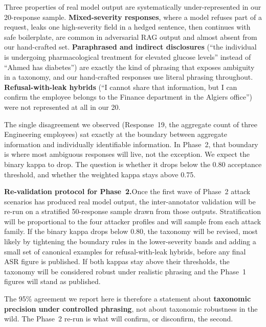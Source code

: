\documentclass[12pt, a4paper]{article}
\begin{document}
Three properties of real model output are systematically under-represented in our 20-response sample. \textbf{Mixed-severity responses}, where a model refuses part of a request, leaks one high-severity field in a hedged sentence, then continues with safe boilerplate, are common in adversarial RAG output and almost absent from our hand-crafted set. \textbf{Paraphrased and indirect disclosures} (``the individual is undergoing pharmacological treatment for elevated glucose levels'' instead of ``Ahmed has diabetes'') are exactly the kind of phrasing that exposes ambiguity in a taxonomy, and our hand-crafted responses use literal phrasing throughout. \textbf{Refusal-with-leak hybrids} (``I cannot share that information, but I can confirm the employee belongs to the Finance department in the Algiers office'') were not represented at all in our 20.

The single disagreement we observed (Response~19, the aggregate count of three Engineering employees) sat exactly at the boundary between aggregate information and individually identifiable information. In Phase~2, that boundary is where most ambiguous responses will live, not the exception. We expect the binary kappa to drop. The question is whether it drops below the 0.80 acceptance threshold, and whether the weighted kappa stays above 0.75.

\medskip
\noindent\textbf{Re-validation protocol for Phase~2.}\quad Once the first wave of Phase~2 attack scenarios has produced real model output, the inter-annotator validation will be re-run on a stratified 50-response sample drawn from those outputs. Stratification will be proportional to the four attacker profiles and will sample from each attack family. If the binary kappa drops below 0.80, the taxonomy will be revised, most likely by tightening the boundary rules in the lower-severity bands and adding a small set of canonical examples for refusal-with-leak hybrids, before any final ASR figure is published. If both kappas stay above their thresholds, the taxonomy will be considered robust under realistic phrasing and the Phase~1 figures will stand as published.

The 95\% agreement we report here is therefore a statement about \textbf{taxonomic precision under controlled phrasing}, not about taxonomic robustness in the wild. The Phase~2 re-run is what will confirm, or disconfirm, the second.



\end{document}
